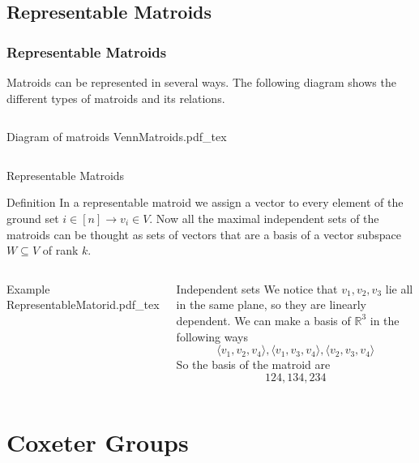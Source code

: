 \documentclass{beamer}
\newcommand{\incfig}[1]{%
\center
\def\svgwidth{0.9\columnwidth}
{#1.pdf_tex}
}
\begin{document}
\subsection{Representable Matroids}
\begin{frame}
\frametitle{Representable Matroids}
Matroids can be represented in several ways. The following diagram shows the different types of matroids and its relations.
\begin{columns}[c]
\begin{block}{Diagram of matroids}
\incfig{VennMatroids}
\end{block}
\end{columns}
\end{frame}

\begin{frame}{Representable Matroids}
\begin{block}{Definition}
  In a representable matroid we assign a vector to every element of the ground set $i\in [n] \to  v_i \in V$. Now all the maximal independent sets of the matroids can be thought as sets of vectors that are a basis of a vector subspace $W\subseteq V$ of rank $k$.
\end{block} 
\vspace{-1em}
\begin{columns}[c]
\begin{block}{Example}
\incfig{RepresentableMatorid}
\end{block}
\begin{block}{Independent sets}
We notice that $v_1, v_2, v_3$ lie all in the same plane, so they are linearly dependent.
We can make a basis of $\mathbb{R}^3$ in the following ways
\[
\langle v_1, v_2, v_4 \rangle , 
\langle v_1, v_3, v_4 \rangle ,
\langle v_2, v_3, v_4 \rangle
\] 
So the basis of the matroid are
\[
  124, 134, 234
\] 
\end{block}
\end{columns}
\end{frame}



\section{Coxeter Groups}
\end{document}

